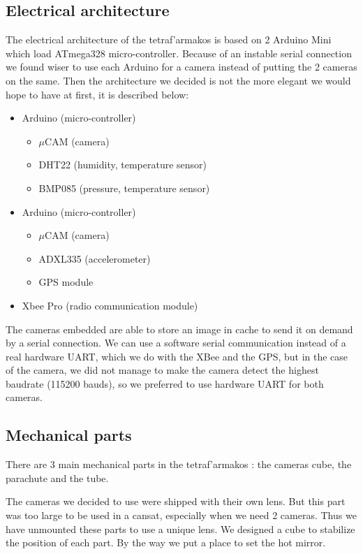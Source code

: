 \documentclass[twocolumn,10pt]{article}
\newcommand\tet{\textgreek{tetraf'armakos} }
\begin{document}
    \subsection{Electrical architecture}%
    \par The electrical architecture of the \tet is based on 2 Arduino Mini which load ATmega328 micro-controller. Because of an instable serial connection we found wiser to use each Arduino for a camera instead of putting the 2 cameras on the same. Then the architecture we decided is not the more elegant we would hope to have at first, it is described below:
    \begin{itemize}
    \item Arduino  (micro-controller)
        \begin{itemize}
        \item $\mu$CAM  (camera)
        \item DHT22 (humidity, temperature sensor)
        \item BMP085 (pressure, temperature sensor)
        \end{itemize}
        
    \item Arduino  (micro-controller)
        \begin{itemize}
        \item $\mu$CAM  (camera)
        \item ADXL335 (accelerometer)
        \item GPS module
        \end{itemize}
        
    \item Xbee Pro (radio communication module)
    \end{itemize}
    
    \par The cameras embedded are able to store an image in cache to send it on demand by a serial connection. We can use a software serial communication instead of a real hardware UART, which we do with the XBee and the GPS, but in the case of the camera, we did not manage to make the camera detect the highest baudrate (115200 bauds), so we preferred to use hardware UART for both cameras.
    
    
    \subsection{Mechanical parts}%
    \par There are 3 main mechanical parts in the \tet :  the cameras cube, the parachute and the tube.
    \par The cameras we decided to use were shipped with their own lens. But this part was too large to be used in a cansat, especially when we need 2 cameras. Thus we have unmounted these parts to use a unique lens. We designed a cube to stabilize the position of each part. By the way we put a place to set the hot mirror.
    
\end{document}
